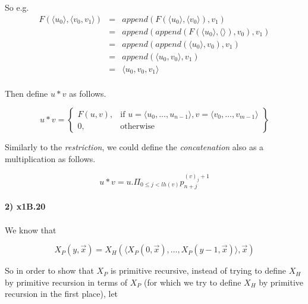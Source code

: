 \documentclass{article}
\begin{document}
So e.g. \[
\begin{array}{rcl}
F(\langle u_0 \rangle,\langle v_0, v_1 \rangle) & = & append(F(\langle u_0 \rangle, \langle v_0 \rangle), v_1) \\

& = & append(append(F(\langle u_0 \rangle,\langle\rangle), v_0), v_1) \\

& = & append(append(\langle u_0 \rangle, v_0), v_1) \\

& = & append(\langle u_0, v_0 \rangle, v_1) \\

& = & \langle u_0,v_0,v_1 \rangle \\

\end{array}
\]

Then define $u * v$ as follows.

\[
u * v = \left\{\begin{array}{lr}
    F(u,v), & \text{if } u = \langle u_0, \ldots, u_{n-1} \rangle, v = \langle v_0, \ldots, v_{m-1} \rangle \\
    0, & \text{otherwise}
  \end{array}\right\}
\]

Similarly to the \textit{restriction}, we could define the \textit{concatenation} also as a multiplication as follows.

\begin{equation*}
u * v = u.\Pi_{0\leq j < lh(v)} p_{n+j}^{(v)_j+1}
\end{equation*}
  
\paragraph{2) x1B.20}

\paragraph{} We know that

\begin{equation*}
  X_P(y,\overrightarrow{x}) = X_H(\langle X_P(0,\overrightarrow{x}), \ldots, X_P(y-1,\overrightarrow{x}) \rangle, \overrightarrow{x})
\end{equation*}

So in order to show that $X_P$ is primitive recursive, instead of trying to define $X_H$ by primitive recursion in terms of $X_P$ (for which we try to define $X_H$ by primitive recursion in the first place), let
\end{document}
